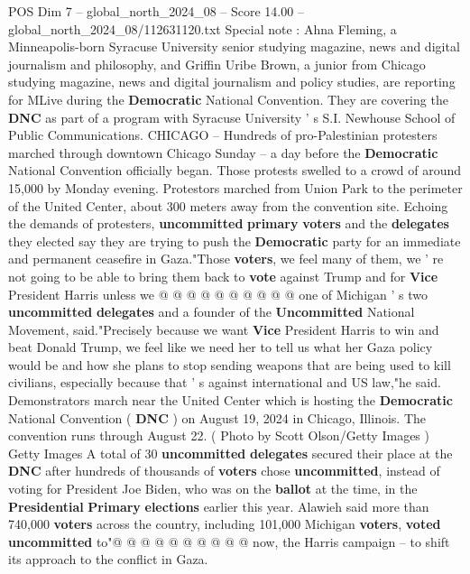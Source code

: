 \begin{textsample}{POS Dim 7 – global\_north\_2024\_08 – Score 14.00 – global\_north\_2024\_08/112631120.txt}  \label{ex:f7_pos_008}
Special note : Ahna Fleming, a Minneapolis-born Syracuse University senior studying magazine, news and digital journalism and philosophy, and Griffin Uribe Brown, a junior from Chicago studying magazine, news and digital journalism and policy studies, are reporting for MLive during the \textbf{Democratic} National Convention.
They are covering the \textbf{DNC} as part of a program with Syracuse University ' s S.I.
Newhouse School of Public Communications.
CHICAGO -- Hundreds of pro-Palestinian protesters marched through downtown Chicago Sunday -- a day before the \textbf{Democratic} National Convention officially began.
Those protests swelled to a crowd of around 15,000 by Monday evening.
Protestors marched from Union Park to the perimeter of the United Center, about 300 meters away from the convention site.
Echoing the demands of protesters, \textbf{uncommitted} \textbf{primary} \textbf{voters} and the \textbf{delegates} they elected say they are trying to push the \textbf{Democratic} party for an immediate and permanent ceasefire in Gaza."Those \textbf{voters}, we feel many of them, we ' re not going to be able to bring them back to \textbf{vote} against Trump and for \textbf{Vice} President Harris unless we @ @ @ @ @ @ @ @ @ @ one of Michigan ' s two \textbf{uncommitted} \textbf{delegates} and a founder of the \textbf{Uncommitted} National Movement, said."Precisely because we want \textbf{Vice} President Harris to win and beat Donald Trump, we feel like we need her to tell us what her Gaza policy would be and how she plans to stop sending weapons that are being used to kill civilians, especially because that ' s against international and US law,"he said.
Demonstrators march near the United Center which is hosting the \textbf{Democratic} National Convention ( \textbf{DNC} ) on August 19, 2024 in Chicago, Illinois.
The convention runs through August 22. ( Photo by Scott Olson/Getty Images ) Getty Images A total of 30 \textbf{uncommitted} \textbf{delegates} secured their place at the \textbf{DNC} after hundreds of thousands of \textbf{voters} chose \textbf{uncommitted}, instead of voting for President Joe Biden, who was on the \textbf{ballot} at the time, in the \textbf{Presidential} \textbf{Primary} \textbf{elections} earlier this year.
Alawieh said more than 740,000 \textbf{voters} across the country, including 101,000 Michigan \textbf{voters}, \textbf{voted} \textbf{uncommitted} to"@ @ @ @ @ @ @ @ @ @ now, the Harris campaign -- to shift its approach to the conflict in Gaza.

\end{textsample}
